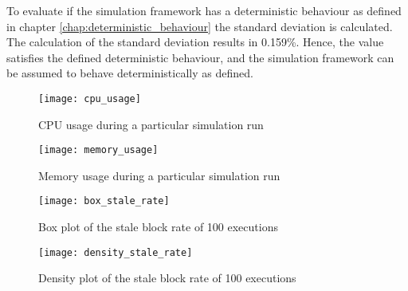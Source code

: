 To evaluate if the simulation framework has a deterministic behaviour as defined in chapter \ref{chap:deterministic_behaviour} the standard deviation is calculated.
The calculation of the standard deviation results in 0.159\%.
Hence, the value satisfies the defined deterministic behaviour, and the simulation framework can be assumed to behave deterministically as defined.

\begin{figure}[t]
\texttt{[image: cpu\_usage]}
\centering
\caption{CPU usage during a particular simulation run}
\label{fig:cpu_usage}
\end{figure}

\begin{figure}[t]
\texttt{[image: memory\_usage]}
\centering
\caption{Memory usage during a particular simulation run}
\label{fig:storage_usage}
\end{figure}

\begin{figure}[t]
\texttt{[image: box\_stale\_rate]}
\centering
\caption{Box plot of the stale block rate of 100 executions}
\label{fig:box_stale_rate}
\end{figure}

\begin{figure}[t]
\texttt{[image: density\_stale\_rate]}
\centering
\caption{Density plot of the stale block rate of 100 executions}
\label{fig:density_stale_rate}
\end{figure}
